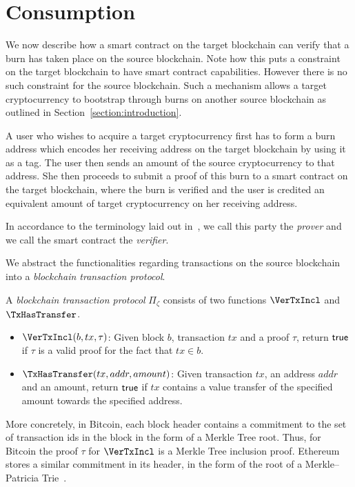 \section{Consumption}

We now describe how a smart contract on the target blockchain can verify that a burn has taken place on the source blockchain. Note how this puts a constraint on the target blockchain to have smart contract capabilities. However there is no such constraint for the source blockchain. Such a mechanism allows a target cryptocurrency to bootstrap through burns on another source blockchain as outlined in Section~\ref{section:introduction}.

A user who wishes to acquire a target cryptocurrency first has to form a burn address which encodes her receiving address on the target blockchain by using it as a tag. The user then sends an amount of the source cryptocurrency to that address. She then proceeds to submit a proof of this burn to a smart contract on the target blockchain, where the burn is verified and the user is credited an equivalent amount of target cryptocurrency on her receiving address.

In accordance to the terminology laid out in~\cite{pow-sidechains}, we call this party the \emph{prover} and we call the smart contract the \emph{verifier}.

We abstract the functionalities regarding transactions on the source blockchain into a \emph{blockchain transaction protocol}.

\begin{definition}\label{def:blockchain-tx}
  A \emph{blockchain transaction protocol} $\Pi_\zeta$ consists of two functions $\VerTxIncl$ and $\TxHasTransfer$.

  \begin{itemize}
    \item $\VerTxIncl(b, tx, \tau)$: Given block $b$, transaction $tx$ and a proof $\tau$, return $\mathsf{true}$ if $\tau$ is a valid proof for the fact that $tx \in b$.
    \item $\TxHasTransfer(tx, addr, amount)$: Given transaction $tx$, an address $addr$ and an amount, return $\mathsf{true}$ if $tx$ contains a value transfer of the specified amount towards the specified address.
  \end{itemize}
\end{definition}

More concretely, in Bitcoin, each block header contains a commitment to the set of transaction ids in the block in the form of a Merkle Tree root. Thus, for Bitcoin the proof $\tau$ for $\VerTxIncl$ is a Merkle Tree inclusion proof. Ethereum stores a similar commitment in its header, in the form of the root of a Merkle--Patricia Trie~\cite{wood2014ethereum}.

